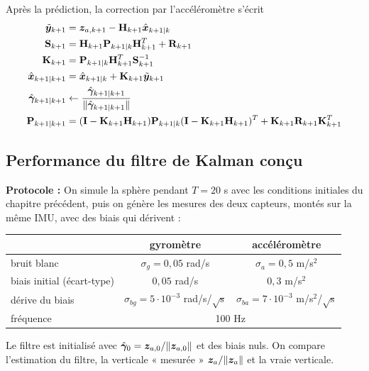 \begin{theoreme}
    Après la prédiction, la correction par l'accéléromètre s'écrit
    \begin{align*}
        \tilde{\bm{y}}_{k+1} &= \bm{z}_{a,k+1} - \mathbf{H}_{k+1}\hat{\bm{x}}_{k+1|k}\\
        \mathbf{S}_{k+1} &= \mathbf{H}_{k+1}\mathbf{P}_{k+1|k}\mathbf{H}_{k+1}^T + \mathbf{R}_{k+1}\\
        \mathbf{K}_{k+1} &= \mathbf{P}_{k+1|k}\mathbf{H}_{k+1}^T\mathbf{S}_{k+1}^{-1}\\
        \hat{\bm{x}}_{k+1|k+1} &= \hat{\bm{x}}_{k+1|k} + \mathbf{K}_{k+1}\tilde{\bm{y}}_{k+1}\\
        \hat{\bm{\gamma}}_{k+1|k+1} &\leftarrow \frac{\hat{\bm{\gamma}}_{k+1|k+1}}{\|\hat{\bm{\gamma}}_{k+1|k+1}\|}\\
        \mathbf{P}_{k+1|k+1} &= (\mathbf{I} - \mathbf{K}_{k+1}\mathbf{H}_{k+1})\mathbf{P}_{k+1|k}(\mathbf{I} - \mathbf{K}_{k+1}\mathbf{H}_{k+1})^T + \mathbf{K}_{k+1}\mathbf{R}_{k+1}\mathbf{K}_{k+1}^T
    \end{align*}
\end{theoreme}

\subsection{Performance du filtre de Kalman conçu}
\textbf{Protocole : } On simule la sphère pendant $T = 20$ s avec les conditions initiales du chapitre précédent, puis on génère les mesures des deux capteurs, montés sur la même IMU, avec des biais qui dérivent :
\begin{center}
\begin{tabular}{lcc}
    & gyromètre & accéléromètre \\
    \hline
    bruit blanc & $\sigma_g = 0{,}05$ rad/s & $\sigma_a = 0{,}5$ m/s$^2$ \\
    biais initial (écart-type) & $0{,}05$ rad/s & $0{,}3$ m/s$^2$ \\
    dérive du biais & $\sigma_{bg} = 5\cdot10^{-3}$ rad/s/$\sqrt{\text{s}}$ & $\sigma_{ba} = 7\cdot10^{-3}$ m/s$^2$/$\sqrt{\text{s}}$ \\
    fréquence & \multicolumn{2}{c}{100 Hz}
\end{tabular}
\end{center}
Le filtre est initialisé avec $\hat{\bm{\gamma}}_0 = \bm{z}_{a,0}/\|\bm{z}_{a,0}\|$ et des biais nuls. On compare l'estimation du filtre, la verticale « mesurée » $\bm{z}_a/\|\bm{z}_a\|$ et la vraie verticale.

